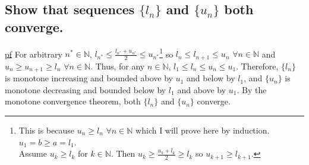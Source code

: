 \documentclass[11pt]{article} %
\begin{document}
	\subsection{Show that sequences $\{ l_n \}$ and $\{ u_n \}$  both converge.}
	\underline{pf} For arbitrary $n^* \in \mathbb{N}$, $l_{n^*} \leq \frac{l_{n^*} +u_{n^*}}{2} \leq u_{n^*}$\footnote{This is because $u_n \geq l_n$ $\forall n \in \mathbb{N} $ which I will prove here by induction. \\ $u_1 = b \geq a = l_1$. \\ Assume $u_k \geq l_k $ for $k \in \mathbb{N}.$ Then $u_k \geq \frac{u_k + l_k}{2} \geq l_k $ so $u_{k+1} \geq l_{k+1}$. } so $l_n \leq l_{n+1} \leq u_n$ $\forall n \in \mathbb{N}$ and $u_n \geq u_{n+1} \geq l_n$ $\forall n \in \mathbb{N}$. Thus, for any $n \in \mathbb{N}$, $l_1 \leq l_n \leq u_n \leq u_1$. Therefore, $\{ l_n \}$ is monotone increasing and bounded above by $u_1$ and below by $l_1$, and $\{ u_n \}$ is monotone decreasing and bounded below by $l_1$ and above by $u_1$. By the monotone convergence theorem, both $\{ l_n \}$ and $\{ u_n \}$ converge.
	
\end{document}
